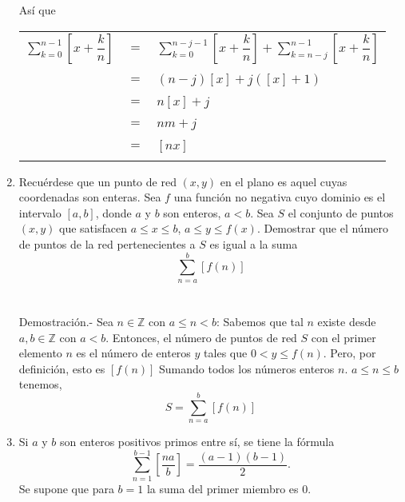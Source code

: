 \begin{enumerate}
\begin{center}
\begin{tabular}{cll}
	    \end{tabular}
	\end{center}
	Así que 
	\begin{center}
	    \begin{tabular}{rcl}
		$\sum\limits_{k=0}^{n-1} \left[x+\dfrac{k}{n}\right]$ & $=$ & $\sum\limits_{k=0}^{n-j-1} \left[x+\dfrac{k}{n}\right] + \sum\limits_{k=n-j}^{n-1} \left[x+\dfrac{k}{n}\right]$\\\\
		& $=$ & $(n-j)[x]+j([x]+1)$\\\\
		& $=$ & $n[x]+j$\\\\
		& $=$ & $nm+j$\\\\
		& $=$ & $[nx]$\\\\
	    \end{tabular}
	\end{center}

	\item Recuérdese que un punto de red $(x,y)$ en el plano es aquel cuyas coordenadas son enteras. Sea $f$ una función no negativa cuyo dominio es el intervalo $[a,b]$, donde $a$ y $b$ son enteros, $a<b$. Sea $S$ el conjunto de puntos $(x,y)$ que satisfacen $a\leq x\leq b$, $a\leq y \leq f(x)$. Demostrar que el número de puntos de la red pertenecientes a $S$ es igual a la suma $$\sum\limits_{n=a}^{b} \left[f(n)\right]$$\\\\
	    Demostración.-\; Sea $n\in \mathbb{Z}$ con $a\leq n < b$: Sabemos que tal $n$ existe desde $a,b \in \mathbb{Z}$ con $a<b$. Entonces, el número de puntos de red $S$ con el primer elemento $n$ es el número de enteros $y$ tales que $0<y\leq f(n)$. Pero, por definición, esto es $[f(n)]$ Sumando todos los números enteros $n$. $a\leq n\leq b$ tenemos, $$S=\sum\limits_{n=a}^{b} \left[f(n)\right]$$

	\item Si $a$ y $b$ son enteros positivos primos entre sí, se tiene la fórmula $$\sum\limits_{n=1}^{b-1} \left[\dfrac{na}{b}\right] = \dfrac{(a-1)(b-1)}{2}.$$ Se supone que para $b=1$ la suma del primer miembro es $0$.\\\\
	
	\begin{enumerate}[\bfseries (a)]


\end{enumerate}
\end{enumerate}
